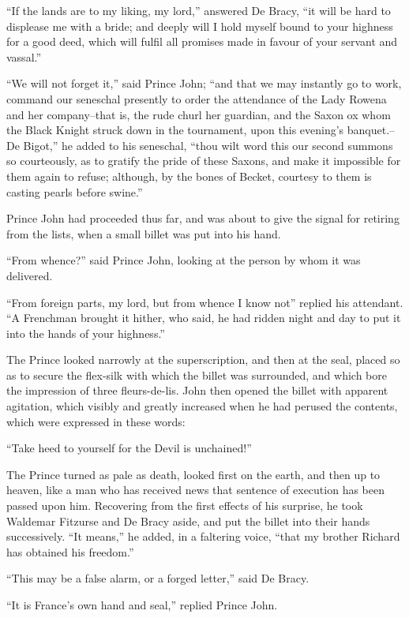 ``If the lands are to my liking, my lord,'' answered De Bracy, ``it will
be hard to displease me with a bride; and deeply will I hold myself
bound to your highness for a good deed, which will fulfil all promises
made in favour of your servant and vassal.''

``We will not forget it,'' said Prince John; ``and that we may instantly
go to work, command our seneschal presently to order the attendance of
the Lady Rowena and her company--that is, the rude churl her guardian,
and the Saxon ox whom the Black Knight struck down in the tournament,
upon this evening's banquet.--De Bigot,'' he added to his seneschal,
``thou wilt word this our second summons so courteously, as to gratify
the pride of these Saxons, and make it impossible for them again to
refuse; although, by the bones of Becket, courtesy to them is casting
pearls before swine.''

Prince John had proceeded thus far, and was about to give the signal for
retiring from the lists, when a small billet was put into his hand.

``From whence?'' said Prince John, looking at the person by whom it was
delivered.

``From foreign parts, my lord, but from whence I know not'' replied his
attendant. ``A Frenchman brought it hither, who said, he had ridden
night and day to put it into the hands of your highness.''

The Prince looked narrowly at the superscription, and then at the seal,
placed so as to secure the flex-silk with which the billet was
surrounded, and which bore the impression of three fleurs-de-lis. John
then opened the billet with apparent agitation, which visibly and
greatly increased when he had perused the contents, which were expressed
in these words:

``Take heed to yourself for the Devil is unchained!''

The Prince turned as pale as death, looked first on the earth, and then
up to heaven, like a man who has received news that sentence of
execution has been passed upon him. Recovering from the first effects of
his surprise, he took Waldemar Fitzurse and De Bracy aside, and put the
billet into their hands successively. ``It means,'' he added, in a
faltering voice, ``that my brother Richard has obtained his freedom.''

``This may be a false alarm, or a forged letter,'' said De Bracy.

``It is France's own hand and seal,'' replied Prince John.

